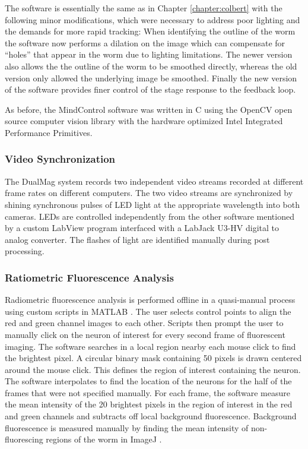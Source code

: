 The software is essentially the same as in Chapter \ref{chapter:colbert} with the following minor modifications, which were necessary to address poor lighting and the demands for more rapid tracking: When identifying the outline of the worm the software now performs a dilation on the image \citep{bradski_learning_2008} which can compensate for ``holes'' that appear in the worm due to lighting limitations. The newer version also allows the the outline of the worm to be smoothed directly, whereas the old version only allowed the underlying image be smoothed. Finally the new version of the software provides finer control of the stage response to the feedback loop. 

As before, the MindControl software was written in C using the OpenCV open source computer vision library \citep{bradski_learning_2008, bradski_opencv_2000} with the hardware optimized Intel Integrated Performance Primitives. 


\subsubsection{Video Synchronization}
The DualMag system records two independent video streams recorded at different frame rates on different computers. The two video streams are synchronized by shining synchronous pulses of LED light at the appropriate wavelength into both cameras. LEDs are controlled independently from the other software mentioned by a custom LabView program  interfaced with a LabJack U3-HV digital to analog converter. The flashes of light are identified manually during post processing. 

\subsubsection{Ratiometric Fluorescence Analysis}
Radiometric fluorescence analysis is performed offline in a quasi-manual process using custom scripts in MATLAB \citep{matlab_version_2010}.  The user selects control points to align the red and green channel images to each other. Scripts then prompt the user to manually click on the neuron of interest for every second frame of fluorescent imaging. The software searches in a local region nearby each mouse click to find the brightest pixel. A circular binary mask containing 50 pixels is drawn centered around the mouse click. This defines the region of interest containing the neuron.  The software interpolates to find the location of the neurons for the half of the frames that were not specified manually. For each frame, the software measure the mean intensity of the 20 brightest pixels in the region of interest in the red and green channels and subtracts off local background fluorescence. Background fluorescence is measured manually by finding the mean intensity of non-fluorescing regions of the worm in ImageJ \citep{rasband_image_1997}.

